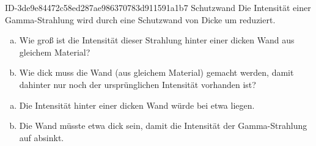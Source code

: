 \begin{exercise}
      {ID-3de9e84472c58ed287ae986370783d911591a1b7}
      {Schutzwand}
  \ifproblem\problem
    Die Intensität einer Gamma-Strahlung wird durch eine Schutzwand
    von  Dicke um  reduziert.
    \begin{enumerate}[a)]
      \item Wie groß ist die Intensität dieser Strahlung hinter
            einer  dicken Wand aus gleichem
            Material?
      \item Wie dick muss die Wand (aus gleichem Material) gemacht
            werden, damit dahinter nur noch  der ursprünglichen
            Intensität vorhanden ist?
    \end{enumerate}
  \fi
  \ifoutcome\outcome
    \begin{enumerate}[a)]
      \item Die Intensität hinter einer  dicken Wand
            würde bei etwa  liegen.
      \item Die Wand müsste etwa  dick sein, damit die
            Intensität der Gam\-ma-Strah\-lung auf  absinkt.
    \end{enumerate}
  \fi
\end{exercise}
